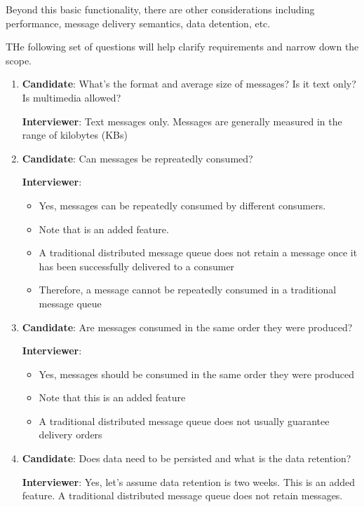\documentclass{report}
\theoremstyle{definition}
\begin{document}
Beyond this basic functionality, there are other considerations including performance, message delivery semantics, data detention, etc.

THe following set of questions will help clarify requirements and narrow down the scope.

\begin{enumerate}
\item
\textbf{Candidate}: What's the format and average size of messages? Is it text only? Is multimedia allowed?

\textbf{Interviewer}: Text messages only. Messages are generally measured in the range of kilobytes (KBs)
\item
\textbf{Candidate}: Can messages be repreatedly consumed?

\textbf{Interviewer}:

\begin{itemize}
\item
Yes, messages can be repeatedly consumed by different consumers.
\item
Note that is an added feature.
\item
A traditional distributed message queue does not retain a message once it has been successfully delivered to a consumer
\item
Therefore, a message cannot be repeatedly consumed in a traditional message queue
\end{itemize}

\item

\textbf{Candidate}: Are messages consumed in the same order they were produced?

\textbf{Interviewer}:

\begin{itemize}
\item
Yes, messages should be consumed in the same order they were produced
\item
Note that this is an added feature
\item
A traditional distributed message queue does not usually guarantee delivery orders
\end{itemize}
\item

\textbf{Candidate}: Does data need to be persisted and what is the data retention?

\textbf{Interviewer}: Yes, let's assume data retention is two weeks. This is an added feature. A traditional distributed message queue does not retain messages.


\end{enumerate}
\end{document}
